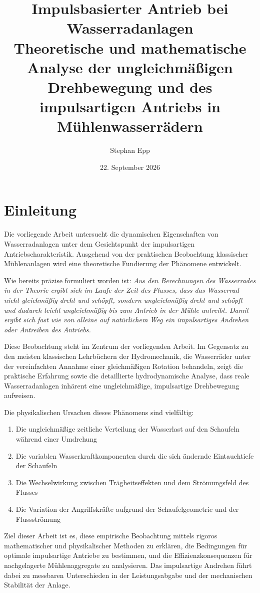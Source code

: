 \documentclass[a4paper,12pt]{article}
\title{%
  \textbf{Impulsbasierter Antrieb bei Wasserradanlagen}\\
  \large Theoretische und mathematische Analyse der ungleichmäßigen Drehbewegung und des impulsartigen Antriebs in Mühlenwasserrädern}
\author{Stephan Epp}
\date{22. September 2026}
\theoremstyle{definition}
\begin{document}
\maketitle
\tableofcontents
\newpage

\section{Einleitung}

Die vorliegende Arbeit untersucht die dynamischen Eigenschaften von Wasserradanlagen unter dem Gesichtspunkt der impulsartigen Antriebscharakteristik. Ausgehend von der praktischen Beobachtung klassischer Mühlenanlagen wird eine theoretische Fundierung der Phänomene entwickelt.

Wie bereits präzise formuliert worden ist: \textit{Aus den Berechnungen des Wasserrades in der Theorie ergibt sich im Laufe der Zeit des Flusses, dass das Wasserrad nicht gleichmäßig dreht und schöpft, sondern ungleichmäßig dreht und schöpft und dadurch leicht ungleichmäßig bis zum Antrieb in der Mühle antreibt. Damit ergibt sich fast wie von alleine auf natürlichem Weg ein impulsartiges Andrehen oder Antreiben des Antriebs.}

Diese Beobachtung steht im Zentrum der vorliegenden Arbeit. Im Gegensatz zu den meisten klassischen Lehrbüchern der Hydromechanik, die Wasserräder unter der vereinfachten Annahme einer gleichmäßigen Rotation behandeln, zeigt die praktische Erfahrung sowie die detaillierte hydrodynamische Analyse, dass reale Wasserradanlagen inhärent eine ungleichmäßige, impulsartige Drehbewegung aufweisen.

Die physikalischen Ursachen dieses Phänomens sind vielfältig:
\begin{enumerate}
  \item Die ungleichmäßige zeitliche Verteilung der Wasserlast auf den Schaufeln während einer Umdrehung
  \item Die variablen Wasserkraftkomponenten durch die sich ändernde Eintauchtiefe der Schaufeln
  \item Die Wechselwirkung zwischen Trägheitseffekten und dem Strömungsfeld des Flusses
  \item Die Variation der Angriffskräfte aufgrund der Schaufelgeometrie und der Flussströmung
\end{enumerate}

Ziel dieser Arbeit ist es, diese empirische Beobachtung mittels rigoros mathematischer und physikalischer Methoden zu erklären, die Bedingungen für optimale impulsartige Antriebe zu bestimmen, und die Effizienzkonsequenzen für nachgelagerte Mühlenaggregate zu analysieren. Das impulsartige Andrehen führt dabei zu messbaren Unterschieden in der Leistungsabgabe und der mechanischen Stabilität der Anlage.
\end{document}
